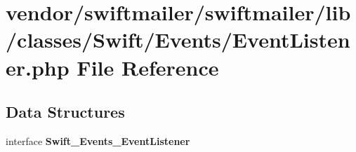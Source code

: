 \section{vendor/swiftmailer/swiftmailer/lib/classes/\+Swift/\+Events/\+Event\+Listener.php File Reference}
\label{_event_listener_8php}
\subsection*{Data Structures}
\begin{DoxyCompactItemize}
\item 
interface {\bf Swift\+\_\+\+Events\+\_\+\+Event\+Listener}
\end{DoxyCompactItemize}
